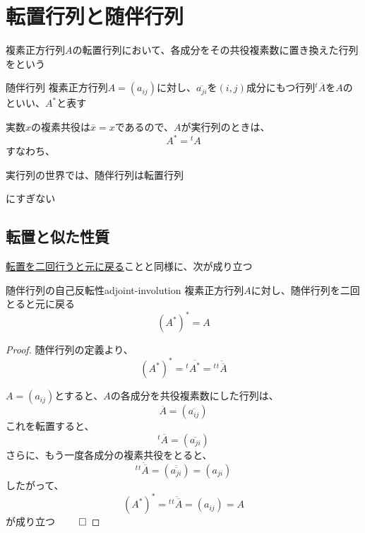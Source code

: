 \documentclass[../../../topic_linear-algebra]{subfiles}
\begin{document}
\sectionline
\section{転置行列と随伴行列}

複素正方行列$A$の転置行列において、各成分をその共役複素数に置き換えた行列をという

\begin{definition}{随伴行列}
  複素正方行列$A = (a_{ij})$に対し、$\overline{a_{ji}}$を$(i,j)$成分にもつ行列${}^t\overline{A}$を$A$のといい、$A^*$と表す
\end{definition}

実数$x$の複素共役は$\overline{x} = x$であるので、$A$が実行列のときは、
\begin{equation*}
  A^* = {}^t A
\end{equation*}
すなわち、
\begin{shaded}
  実行列の世界では、随伴行列は転置行列
\end{shaded}
にすぎない

\subsection{転置と似た性質}

\hyperref[thm:transpose-involution]{転置を二回行うと元に戻る}ことと同様に、次が成り立つ

\begin{theorem}{随伴行列の自己反転性}{adjoint-involution}
  複素正方行列$A$に対し、随伴行列を二回とると元に戻る
  \begin{equation*}
    (A^*)^* = A
  \end{equation*}
\end{theorem}

\begin{proof}
  随伴行列の定義より、
  \begin{equation*}
    (A^*)^* = {}^t\overline{A^*} = {}^t\overline{{}^t\overline{A}}
  \end{equation*}

  $A = (a_{ij})$とすると、$A$の各成分を共役複素数にした行列は、
  \begin{equation*}
    \overline{A} = (\overline{a_{ij}})
  \end{equation*}
  これを転置すると、
  \begin{equation*}
    {}^t\overline{A} = (\overline{a_{ji}})
  \end{equation*}
  さらに、もう一度各成分の複素共役をとると、
  \begin{equation*}
    {}^t\overline{{}^t\overline{A}} = (\overline{\overline{a_{ji}}}) = (a_{ji})
  \end{equation*}
  したがって、
  \begin{equation*}
    (A^*)^* = {}^t\overline{{}^t\overline{A}} = (a_{ij}) = A
  \end{equation*}
  が成り立つ $\qed$
\end{proof}
\end{document}
